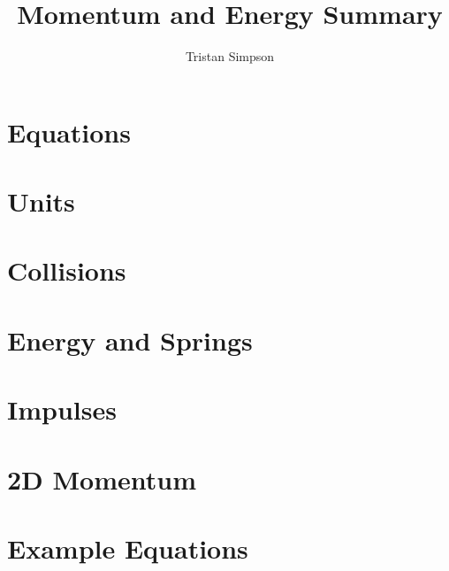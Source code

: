 \documentclass{article}
\title{Momentum and Energy Summary}
\author{Tristan Simpson}
\begin{document}
\maketitle
\let\clearpage\relax

\section{Equations}


\section{Units}


\vspace*{0.5cm}
\section{Collisions}


\section{Energy and Springs}


\section{Impulses}


\section{2D Momentum}


\section{Example Equations}
\begin{adjustwidth}{1cm}{0pt}
    
    
    
    
    
    

    
\end{adjustwidth}
\end{document}
